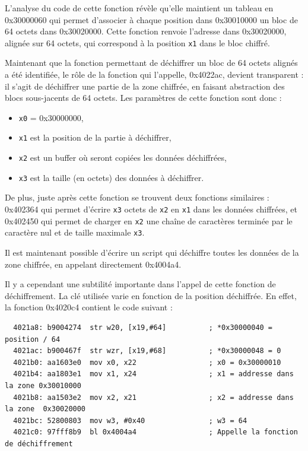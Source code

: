 \documentclass[a4paper,10pt]{article}
\begin{document}
L'analyse du code de cette fonction révèle qu'elle maintient un tableau en 0x30000060 qui permet d'associer à chaque position dans 0x30010000 un bloc de 64 octets dans 0x30020000. Cette fonction renvoie l'adresse dans 0x30020000, alignée sur 64 octets, qui correspond à la position \texttt{x1} dans le bloc chiffré.

Maintenant que la fonction permettant de déchiffrer un bloc de 64 octets alignés a été identifiée, le rôle de la fonction qui l'appelle, 0x4022ac, devient transparent : il s'agit de déchiffrer une partie de la zone chiffrée, en faisant abstraction des blocs sous-jacents de 64 octets. Les paramètres de cette fonction sont donc :
\begin{itemize}
\item \texttt{x0} = 0x30000000,
\item \texttt{x1} est la position de la partie à déchiffrer,
\item \texttt{x2} est un buffer où seront copiées les données déchiffrées,
\item \texttt{x3} est la taille (en octets) des données à déchiffrer.
\end{itemize}

De plus, juste après cette fonction se trouvent deux fonctions similaires : 0x402364 qui permet d'écrire \texttt{x3} octets de \texttt{x2} en \texttt{x1} dans les données chiffrées, et 0x402450 qui permet de charger en \texttt{x2} une chaîne de caractères terminée par le caractère nul et de taille maximale \texttt{x3}.

Il est maintenant possible d'écrire un script qui déchiffre toutes les données de la zone chiffrée, en appelant directement 0x4004a4.

Il y a cependant une subtilité importante dans l'appel de cette fonction de déchiffrement. La clé utilisée varie en fonction de la position déchiffrée. En effet, la fonction 0x4020c4 contient le code suivant :
\begin{verbatim}
  4021a8: b9004274  str w20, [x19,#64]          ; *0x30000040 = position / 64
  4021ac: b900467f  str wzr, [x19,#68]          ; *0x30000048 = 0
  4021b0: aa1603e0  mov x0, x22                 ; x0 = 0x30000010
  4021b4: aa1803e1  mov x1, x24                 ; x1 = addresse dans la zone 0x30010000
  4021b8: aa1503e2  mov x2, x21                 ; x2 = addresse dans la zone  0x30020000
  4021bc: 52800803  mov w3, #0x40               ; w3 = 64
  4021c0: 97fff8b9  bl 0x4004a4                 ; Appelle la fonction de déchiffrement
\end{verbatim}
\end{document}
